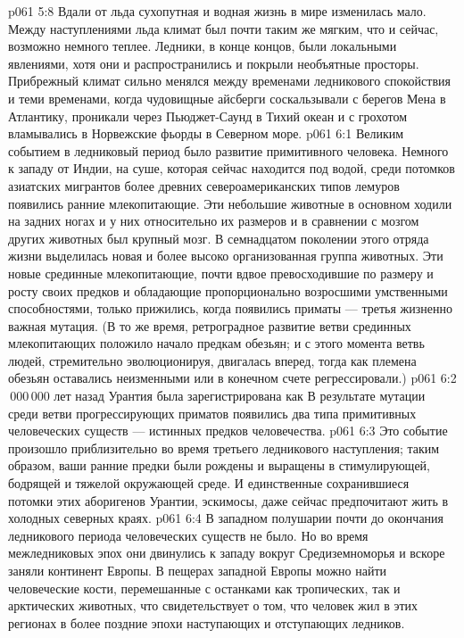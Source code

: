 \vs p061 5:8 Вдали от льда сухопутная и водная жизнь в мире изменилась мало. Между наступлениями льда климат был почти таким же мягким, что и сейчас, возможно немного теплее. Ледники, в конце концов, были локальными явлениями, хотя они и распространились и покрыли необъятные просторы. Прибрежный климат сильно менялся между временами ледникового спокойствия и теми временами, когда чудовищные айсберги соскальзывали с берегов Мена в Атлантику, проникали через Пьюджет\hyp{}Саунд в Тихий океан и с грохотом вламывались в Норвежские фьорды в Северном море.
\vs p061 6:1 Великим событием в ледниковый период было развитие примитивного человека. Немного к западу от Индии, на суше, которая сейчас находится под водой, среди потомков азиатских мигрантов более древних североамериканских типов лемуров  появились ранние млекопитающие. Эти небольшие животные в основном ходили на задних ногах и у них относительно их размеров и в сравнении с мозгом других животных был крупный мозг. В семнадцатом поколении этого отряда жизни  выделилась новая и более высоко организованная группа животных. Эти новые срединные млекопитающие, почти вдвое превосходившие по размеру и росту своих предков и обладающие пропорционально возросшими умственными способностями, только прижились, когда  появились приматы --- третья жизненно важная мутация. (В то же время, ретроградное развитие ветви срединных млекопитающих положило начало предкам обезьян; и с этого момента ветвь людей, стремительно эволюционируя, двигалась вперед, тогда как племена обезьян оставались неизменными или в конечном счете регрессировали.)
\vs p061 6:2 \,000\,000 лет назад Урантия была зарегистрирована как  В результате мутации среди ветви прогрессирующих приматов  появились два типа примитивных человеческих существ --- истинных предков человечества.
\vs p061 6:3 Это событие произошло приблизительно во время третьего ледникового наступления; таким образом, ваши ранние предки были рождены и выращены в стимулирующей, бодрящей и тяжелой окружающей среде. И единственные сохранившиеся потомки этих аборигенов Урантии, эскимосы, даже сейчас предпочитают жить в холодных северных краях.
\vs p061 6:4 \pc В западном полушарии почти до окончания ледникового периода человеческих существ не было. Но во время межледниковых эпох они двинулись к западу вокруг Средиземноморья и вскоре заняли континент Европы. В пещерах западной Европы можно найти человеческие кости, перемешанные с останками как тропических, так и арктических животных, что свидетельствует о том, что человек жил в этих регионах в более поздние эпохи наступающих и отступающих ледников.
